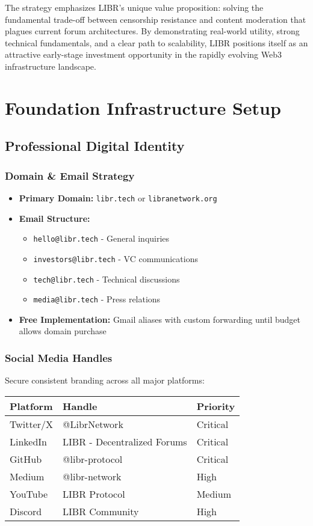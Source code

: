 \documentclass[12pt,a4paper]{article}
\begin{document}
The strategy emphasizes LIBR's unique value proposition: solving the fundamental trade-off between censorship resistance and content moderation that plagues current forum architectures. By demonstrating real-world utility, strong technical fundamentals, and a clear path to scalability, LIBR positions itself as an attractive early-stage investment opportunity in the rapidly evolving Web3 infrastructure landscape.

\section{Foundation Infrastructure Setup}

\subsection{Professional Digital Identity}

\subsubsection{Domain \& Email Strategy}
\begin{itemize}
    \item \textbf{Primary Domain:} \texttt{libr.tech} or \texttt{libranetwork.org}
    \item \textbf{Email Structure:}
    \begin{itemize}
        \item \texttt{hello@libr.tech} - General inquiries
        \item \texttt{investors@libr.tech} - VC communications
        \item \texttt{tech@libr.tech} - Technical discussions
        \item \texttt{media@libr.tech} - Press relations
    \end{itemize}
    \item \textbf{Free Implementation:} Gmail aliases with custom forwarding until budget allows domain purchase
\end{itemize}

\subsubsection{Social Media Handles}
Secure consistent branding across all major platforms:
\begin{center}
\begin{tabular}{|l|l|l|}
\hline
\textbf{Platform} & \textbf{Handle} & \textbf{Priority} \\
\hline
Twitter/X & @LibrNetwork & Critical \\
\hline
LinkedIn & LIBR - Decentralized Forums & Critical \\
\hline
GitHub & @libr-protocol & Critical \\
\hline
Medium & @libr-network & High \\
\hline
YouTube & LIBR Protocol & Medium \\
\hline
Discord & LIBR Community & High \\
\hline
\end{tabular}
\end{center}
\end{document}
